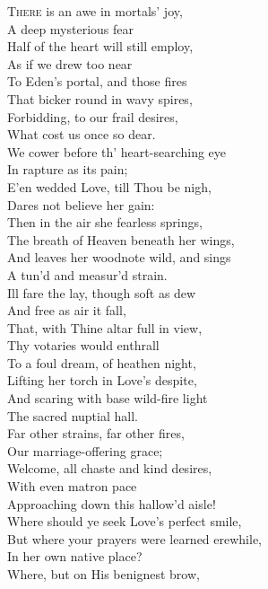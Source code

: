 
\textsc{There} is an awe in mortals’ joy, \\
 A deep mysterious fear \\
 Half of the heart will still employ, \\
 As if we drew too near \\
 To Eden’s portal, and those fires \\
 That bicker round in wavy spires, \\
 Forbidding, to our frail desires, \\
 What cost us once so dear. \\
  We cower before th’ heart-searching eye \\
 In rapture as its pain; \\
 E’en wedded Love, till Thou be nigh, \\
 Dares not believe her gain: \\
 Then in the air she fearless springs, \\
 The breath of Heaven beneath her wings, \\
 And leaves her woodnote wild, and sings \\
 A tun’d and measur’d strain. \\
  Ill fare the lay, though soft as dew \\
 And free as air it fall, \\
 That, with Thine altar full in view, \\
 Thy votaries would enthrall \\
 To a foul dream, of heathen night, \\
 Lifting her torch in Love’s despite, \\
 And scaring with base wild-fire light \\
 The sacred nuptial hall. \\
  Far other strains, far other fires, \\
 Our marriage-offering grace; \\
 Welcome, all chaste and kind desires, \\
 With even matron pace \\
 Approaching down this hallow’d aisle! \\
 Where should ye seek Love’s perfect smile, \\
 But where your prayers were learned erewhile, \\
 In her own native place? \\
  Where, but on His benignest brow, \\
